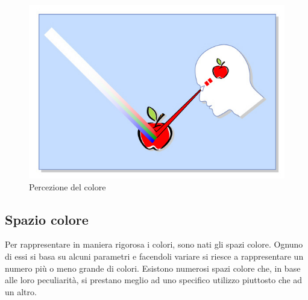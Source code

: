 \documentclass[a4paper,11pt]{article}
\begin{document}
        \begin{figure}[h]
            \centering
            \includegraphics[scale=0.8]{colorimetria1}
            \caption{Percezione del colore}
        \end{figure}
        \newpage
        \subsection{Spazio colore}
        Per rappresentare in maniera rigorosa i colori, sono nati gli spazi colore. Ognuno di essi si basa su alcuni parametri
        e facendoli variare si riesce a rappresentare un numero più o meno grande di colori. Esistono numerosi spazi colore
        che, in base alle loro peculiarità, si prestano meglio ad uno specifico utilizzo piuttosto che ad un altro.
       
\end{document}
